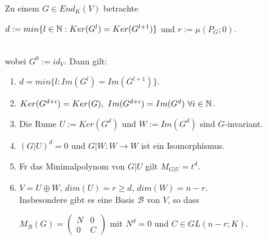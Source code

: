 \documentclass[11pt, a4paper]{article}
\begin{document}
\begin{lemma}
 Zu einem $G \in End_K(V) $ betrachte
\\ \centerline{$d := min \{ l \in \mathbb{N} : Ker (G^l) =Ker(G^{l + 1}) \}$ und $r := \mu (P_G ; 0)$.}
\\wobei $G^0 := id_V$. Dann gilt:
\begin{enumerate}
\item $d =min \{l : Im(G^l) = Im(G^{l + 1}) \}.$
\item $Ker (G^{d + i}) = Ker (G), \ Im (G^{d + i}) = Im (G^d)\ \forall i \in \mathbb{N}$.
\item Die R\aee ume $U := Ker (G^d)$ und $W := Im (G^d)$ sind $G$-invariant.
\item $(G|U)^d = 0$ und $G|W: W \rightarrow W$ ist ein Isomorphismus.
\item F\uee r das Minimalpolynom von $G|U$ gilt $M_{G|U} = t^d$.
\item $V = U \oplus W$, $dim(U) = r \geq d$, $dim(W) = n - r$.
\\ Insbesondere gibt es eine Basis $\mathcal{B}$ von $V$, so dass
\\ \centerline{$M_\mathcal{B}(G) =
\left(\begin{array}{ll}{N} & {0} 
\\ {0} & {C}\end{array}\right) 
$
mit  $N^d = 0$ und $C \in GL (n-r; K)$.}
\end{enumerate}
\end{lemma}
\end{document}
